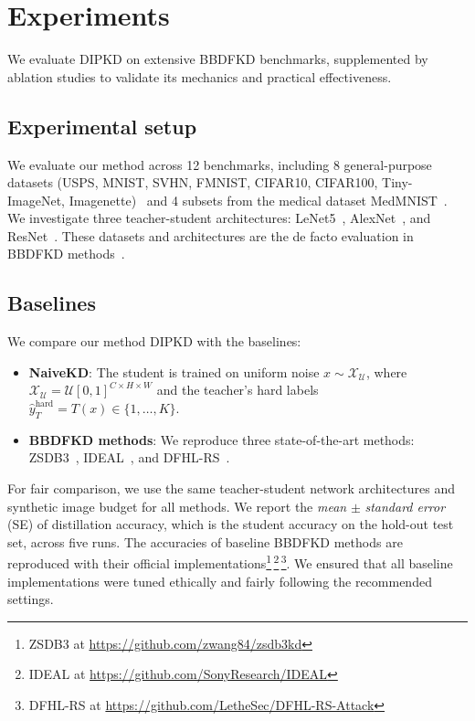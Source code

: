 \section{Experiments} \label{sec:44-research02-experiments}
\begin{foldable} %
  We evaluate \ac{DIPKD} on extensive BBDFKD benchmarks, supplemented by ablation studies to validate its mechanics and practical effectiveness.
\end{foldable}

\subsection{Experimental setup} \label{sec:44-research02-experiments-setup}
\begin{foldable} %
  We evaluate our method across 12 benchmarks, including 8 general-purpose datasets (USPS, MNIST, SVHN, FMNIST, CIFAR10, CIFAR100, Tiny-ImageNet, Imagenette)~\cite{lecun1998gradient,hull1994database,netzer2011reading,xiao2017fashion,krizhevsky2009learning,le2015tiny,howard2020imagenette} and 4 subsets from the medical dataset MedMNIST~\cite{yang2021medmnist}.
  We investigate three teacher-student architectures: LeNet5~\cite{lecun1998gradient}, AlexNet~\cite{krizhevsky2012imagenet}, and ResNet~\cite{he2016deep}.
  These datasets and architectures are the de facto evaluation in BBDFKD methods~\cite{wang2021zero, zhang2022ideal, yuan2024data}.
\end{foldable}

\subsection{Baselines} \label{sec:44-research02-experiments-baselines}
\begin{foldable} %
  We compare our method \ac{DIPKD} with the baselines:
  \begin{itemize}
    \item \textbf{NaiveKD}: The student is trained on uniform noise $x \sim \mathcal{X}_\mathcal{U}$, where $\mathcal{X}_\mathcal{U}=\mathcal{U}[0,1]^{C \times H \times W}$ and the teacher's hard labels $\hat{y}_{T}^\text{hard} = T(x) \in \{1, \ldots, K\}$.
    \item \textbf{BBDFKD methods}: We reproduce three state-of-the-art methods: ZSDB3~\cite{wang2021zero}, IDEAL~\cite{zhang2022ideal}, and DFHL-RS~\cite{yuan2024data}.
  \end{itemize}
  For fair comparison, we use the same teacher-student network architectures and synthetic image budget for all methods.
  We report the \textit{mean} $\pm$ \textit{standard error} (SE) of distillation accuracy, which is the student accuracy on the hold-out test set, across five runs.
  The accuracies of baseline BBDFKD methods are reproduced with their official implementations\footnote{ZSDB3 at \url{https://github.com/zwang84/zsdb3kd}}\,\footnote{IDEAL at \url{https://github.com/SonyResearch/IDEAL}}\,\footnote{DFHL-RS at \url{https://github.com/LetheSec/DFHL-RS-Attack}}.
  We ensured that all baseline implementations were tuned ethically and fairly following the recommended settings.
\end{foldable}

